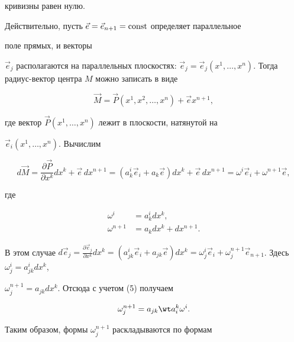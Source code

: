 кривизны равен нулю. 


 


Действительно, пусть $\Vec e=\Vec e_{n+1}=\operatorname{const}$ определяет параллельное 


поле прямых, и векторы 


$\Vec e_j$ располагаются на параллельных плоскостях: $\Vec e_j=\Vec 


e_j(x^1,\dotsc,x^n)$. Тогда радиус-вектор центра $M$ можно записать в виде 


$$ 


\Vec M=\Vec P(x^1,x^2,\dotsc,x^n)+\Vec e x^{n+1}, 


$$ 


где вектор $\Vec P(x^1,\dotsc,x^n)$ лежит в плоскости, натянутой на 


$\Vec e_i(x^1,\dotsc,x^n)$. Вычислим


$$ 


d\Vec M=\frac{\partial\Vec P}{\partial x^k}d x^k+\Vec e\,d x^{n+1}= 


(a^i_k\Vec e_i+a_k\Vec e)d x^k+\Vec e\,d x^{n+1}= 


\omega^i\Vec e_i+\omega^{n+1}\Vec e, 


$$ 


где 


\begin{equation} 


\begin{split} 


\omega^i&=a^i_k d x^k,\\ 


\omega^{n+1}&=a_k d x^k+d x^{n+1}. 


\end{split} 


\end{equation} 


В этом случае $d\Vec e_j=\frac{\partial\Vec e_j}{\partial x^k}d 


x^k=(a^i_{j k}\Vec e_i+a_{j k}\Vec e)d x^k=\omega^i_j\Vec 


e_i+\omega^{n+1}_j\Vec e_{n+1}$. Здесь $\omega^i_j=a^i_{j k}d x^k$, 


$\omega^{n+1}_j=a_{j k}d x^k$. Отсюда с учетом (5) получаем 


$$ 


\omega^{n+1}_j=a_{j k}\wt a^k_i \omega^i. 


$$ 


Таким образом, формы $\omega^{n+1}_j$ раскладываются по формам 


